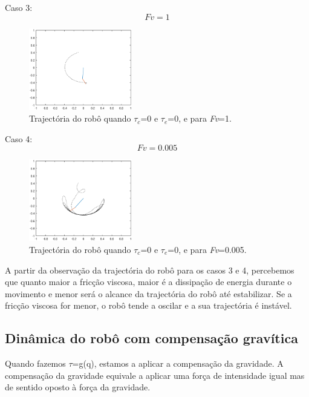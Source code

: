 \documentclass[a4paper,twocolumn,final,11pt]{article}
\begin{document}
Caso 3: 
\begin{equation}
    Fv = 1
\end{equation}
\begin{figure}[H]
	\centering
	\includegraphics[width=0.4\textwidth]{4_fv_1.eps}
	\caption{Trajectória do robô quando $\tau_c$=0 e $\tau_e$=0, e para \textit{Fv}=1.}
  \label{fig6}
\end{figure}

Caso 4: 
\begin{equation}
    Fv = 0.005
\end{equation}
\begin{figure}[H]
	\centering
	\includegraphics[width=0.4\textwidth]{4_fv_0005.eps}
	\caption{Trajectória do robô quando $\tau_c$=0 e $\tau_e$=0, e para \textit{Fv}=0.005.}
  \label{fig7}
\end{figure}

A partir da observação da trajectória do robô para os casos 3 e 4, percebemos que quanto maior a fricção viscosa, maior é a dissipação de energia durante o movimento e menor será o alcance da trajectória do robô até estabilizar. Se a fricção viscosa for menor, o robô tende a oscilar e a sua trajectória é instável. 

\subsection{Dinâmica do robô com compensação gravítica}

Quando fazemos $\tau$=g(q), estamos a aplicar a compensação da gravidade. A compensação da gravidade equivale a aplicar uma força de intensidade igual mas de sentido oposto à força da gravidade.
\end{document}
